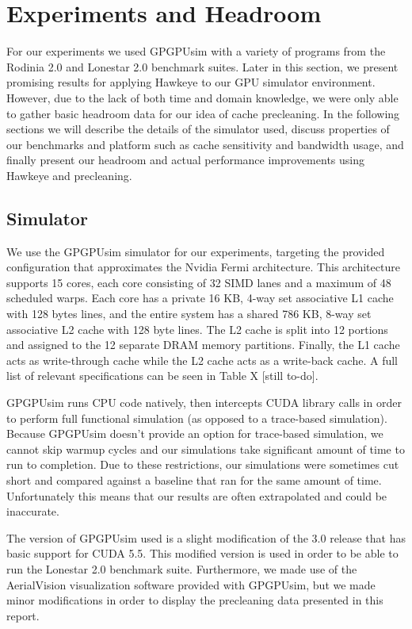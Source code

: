 \chapter{Experiments and Headroom}

For our experiments we used GPGPUsim with a variety of programs from the Rodinia 2.0 \cite{rodinia} and Lonestar 2.0 \cite{lonestar} benchmark suites. Later in this section, we present promising results for applying Hawkeye to our GPU simulator environment. However, due to the lack of both time and domain knowledge, we were only able to gather basic headroom data for our idea of cache precleaning. In the following sections we will describe the details of the simulator used, discuss properties of our benchmarks and platform such as cache sensitivity and bandwidth usage, and finally present our headroom and actual performance improvements using Hawkeye and precleaning.

\section{Simulator}
We use the GPGPUsim \cite{gpgpusim} simulator for our experiments, targeting the provided configuration that approximates the Nvidia Fermi architecture. This architecture supports 15 cores, each core consisting of 32 SIMD lanes and a maximum of 48 scheduled warps. Each core has a private 16 KB, 4-way set associative L1 cache with 128 bytes lines, and the entire system has a shared 786 KB, 8-way set associative L2 cache with 128 byte lines. The L2 cache is split into 12 portions and assigned to the 12 separate DRAM memory partitions. Finally, the L1 cache acts as write-through cache while the L2 cache acts as a write-back cache. A full list of relevant specifications can be seen in Table X [still to-do].

GPGPUsim runs CPU code natively, then intercepts CUDA library calls in order to perform full functional simulation (as opposed to a trace-based simulation). Because GPGPUsim doesn’t provide an option for trace-based simulation, we cannot skip warmup cycles and our simulations take significant amount of time to run to completion. Due to these restrictions, our simulations were sometimes cut short and compared against a baseline that ran for the same amount of time. Unfortunately this means that our results are often extrapolated and could be inaccurate.

The version of GPGPUsim used is a slight modification of the 3.0 release that has basic support for CUDA 5.5. This modified version is used in order to be able to run the Lonestar 2.0 benchmark suite. Furthermore, we made use of the AerialVision \cite{aerialvision} visualization software provided with GPGPUsim, but we made minor modifications in order to display the precleaning data presented in this report.

